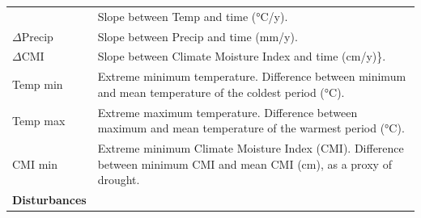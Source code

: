 \documentclass[a4paperpaper,]{article}
\begin{document}
\begin{longtable}[]{@{}ll@{}}
\begin{minipage}[t]{0.22\columnwidth}
\end{minipage} & \begin{minipage}[t]{0.72\columnwidth}\raggedright
Slope between Temp and time (°C/y).\strut
\end{minipage}\tabularnewline
\begin{minipage}[t]{0.22\columnwidth}\raggedright
\(\Delta\)Precip\strut
\end{minipage} & \begin{minipage}[t]{0.72\columnwidth}\raggedright
Slope between Precip and time (mm/y).\strut
\end{minipage}\tabularnewline
\begin{minipage}[t]{0.22\columnwidth}\raggedright
\(\Delta\)CMI\strut
\end{minipage} & \begin{minipage}[t]{0.72\columnwidth}\raggedright
Slope between Climate Moisture Index and time (cm/y)\}.\strut
\end{minipage}\tabularnewline
\begin{minipage}[t]{0.22\columnwidth}\raggedright
Temp min\strut
\end{minipage} & \begin{minipage}[t]{0.72\columnwidth}\raggedright
Extreme minimum temperature. Difference between minimum and mean
temperature of the coldest period (°C).\strut
\end{minipage}\tabularnewline
\begin{minipage}[t]{0.22\columnwidth}\raggedright
Temp max\strut
\end{minipage} & \begin{minipage}[t]{0.72\columnwidth}\raggedright
Extreme maximum temperature. Difference between maximum and mean
temperature of the warmest period (°C).\strut
\end{minipage}\tabularnewline
\begin{minipage}[t]{0.22\columnwidth}\raggedright
CMI min\strut
\end{minipage} & \begin{minipage}[t]{0.72\columnwidth}\raggedright
Extreme minimum Climate Moisture Index (CMI). Difference between minimum
CMI and mean CMI (cm), as a proxy of drought.\strut
\end{minipage}\tabularnewline
\begin{minipage}[t]{0.22\columnwidth}\raggedright
\textbf{Disturbances}\strut
\end{minipage} & \begin{minipage}[t]{0.72\columnwidth}\raggedright
\strut

\end{minipage}
\end{longtable}
\end{document}
